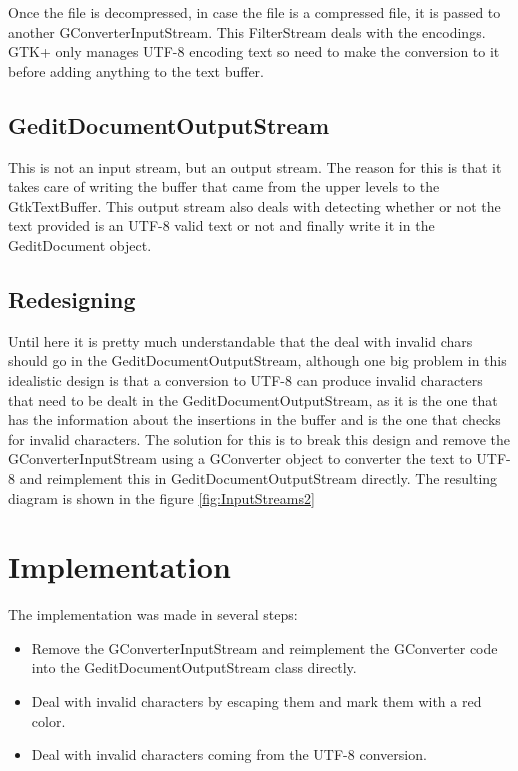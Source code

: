 Once the file is decompressed, in case the file is a compressed file, it is passed to another GConverterInputStream. This FilterStream deals with the encodings. GTK+ only manages UTF-8 encoding text so need to make the conversion to it before adding anything to the text buffer.

\subsection*{GeditDocumentOutputStream}

This is not an input stream, but an output stream. The reason for this is that it takes care of writing the buffer that came from the upper levels to the GtkTextBuffer. This output stream also deals with detecting whether or not the text provided is an UTF-8 valid text or not and finally write it in the GeditDocument object.

\subsection{Redesigning}

Until here it is pretty much understandable that the deal with invalid chars should go in the GeditDocumentOutputStream, although one big problem in this idealistic design is that a conversion to UTF-8 can produce invalid characters that need to be dealt in the GeditDocumentOutputStream, as it is the one that has the information about the insertions in the buffer and is the one that checks for invalid characters. The solution for this is to break this design and remove the GConverterInputStream using a GConverter object to converter the text to UTF-8 and reimplement this in GeditDocumentOutputStream directly. The resulting diagram is shown in the figure \ref{fig:InputStreams2}


\newpage
\section{Implementation}

The implementation was made in several steps:
\begin{itemize}
  \item Remove the GConverterInputStream and reimplement the GConverter code into the GeditDocumentOutputStream class directly.
  \item Deal with invalid characters by escaping them and mark them with a red color.
  \item Deal with invalid characters coming from the UTF-8 conversion.
\end{itemize}

